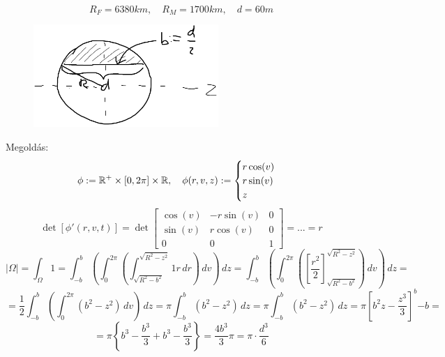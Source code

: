 \documentclass[a4paper,11.5pt]{article}
\begin{document}
	\begin{task}
		\[ R_F=6380km,\quad R_M=1700km,\quad d=60m \]
		\begin{figure}[h]
			\centering
			\includegraphics[width=7cm]{kepek/05.png}
			\caption{}
		\end{figure}
		
		Megoldás:
		\[ \phi:=\mathbb{R}^+\times[0,2\pi]\times\mathbb{R},\quad \phi(r,v,z):=\begin{cases}
			r\cos(v)\\
			r\sin(v)\\
			z
		\end{cases}\]\[ \det[\phi'(r,v,t)]=\det \begin{bmatrix}
			\cos(v)&-r\sin(v)&0\\
			\sin(v)&r\cos(v)&0\\
			0&0&1
		\end{bmatrix}=...=r \]
		\[ |\varOmega|=\int_{\varOmega}^{}1=\int_{-b}^{b}\left(\int_{0}^{2\pi}\left(\int_{\sqrt{R^2-b^2}}^{\sqrt{R^2-z^2}}1r\,dr\right)\,dv\right)\,dz=\int_{-b}^{b}\left(\int_0^{2\pi}\left(\left[\frac{r^2}{2}\right]_{\sqrt{R^2-b^2}}^{\sqrt{R^2-z^2}} \right)\,dv\right)\,dz=\]
		\[=\frac{1}{2}\int_{-b}^{b}\left(\int_{0}^{2\pi}(b^2-z^2)\,dv\right)\,dz=\pi\int_{-b}^{b}(b^2-z^2)\,dz=\pi\int_{-b}^{b}(b^2-z^2)\,dz=\pi\left[b^2z-\frac{z^3}{3}\right]^b{-b}=\]
		\[=\pi\left\{ b^3-\frac{b^3}{3}+b^3-\frac{b^3}{3} \right\}=\frac{4b^3}{3}\pi=\pi\cdot\frac{d^3}{6} \]
	\end{task}
\end{document}
